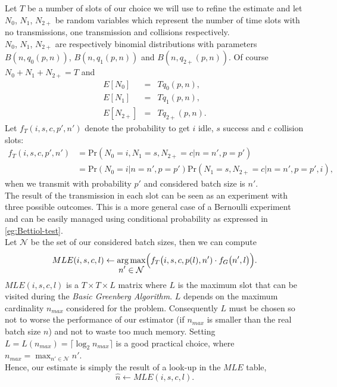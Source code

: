 \documentclass[11pt,a4paper,twoside,openright]{book}
\DeclareMathOperator*{\argmax}{arg\,max}
\DeclareMathOperator*{\mymax}{max}
\newcommand{\fg}{f_{G}}
\begin{document}
 Let $T$ be a number of slots of our choice we will use to refine the estimate and let $N_{0}$, $N_{1}$, $N_{2+}$ be random variables which represent the number of time slots with no transmissions, one transmission and collisions respectively.\\
 $N_{0}$, $N_{1}$, $N_{2+}$ are respectively binomial distributions with parameters $B(n,q_{0}(p,n))$, $B(n,q_{1}(p,n))$ and $B(n,q_{2+}(p,n))$. Of course $N_{0}+N_{1}+N_{2+}=T$ and
 \begin{eqnarray*}
E[N_{0}] &=& Tq_{0}(p,n),\\
E[N_{1}] &=& Tq_{1}(p,n),\\
E[N_{2+}] &=& Tq_{2+}(p,n).
\end{eqnarray*}
Let $f_{T}(i,s,c,p',n')$ denote the probability to get $i$ idle, $s$ success and $c$ collision slots:
\begin{align}
\label{eg:Bettiol-test}
f_{T}(i,s,c,p',n')&= \textrm{Pr}(N_{0}=i,N_{1}=s,N_{2+}=c|n=n',p=p')\\
\nonumber
 &=\textrm{Pr}(N_{0}=i|n=n',p=p')\textrm{Pr}(N_{1}=s,N_{2+}=c|n=n',p=p',i),
\end{align}
when we transmit with probability $p'$ and considered batch size is $n'$.\\
The result of the transmission in each slot can be seen as an experiment with three possible outcomes. This is a more general case of a Bernoulli experiment and can be easily managed using conditional probability as expressed in \eqref{eg:Bettiol-test}. \\
Let $\mathcal{N}$ be the set of our considered batch sizes, then we can compute
\begin{equation}
MLE(i,s,c,l) \gets \argmax_{\displaystyle{n' \in \mathcal{N}}} \Bigl( f_{T}\bigl(i,s,c,p(l),n')\cdot \fg\bigl(n',l\bigr)\Bigr).
\label{eq:MLEiscl}
\end{equation}
$MLE(i,s,c,l)$ is a $T \times T \times L$ matrix where $L$ is the maximum slot that can be visited during the  \emph{Basic Greenberg Algorithm}. $L$ depends on the maximum cardinality  $n_{max}$ considered for the problem. Consequently  $L$ must be chosen so not to worse the performance of our estimator (if $n_{max}$ is smaller than the real batch size $n$) and not to waste too much memory. Setting $L= L(n_{max}) = \lceil\log_{2}n_{max}\rceil$ is a good practical choice, where $\displaystyle n_{max}= \mymax_{n' \in \mathcal{N}}{n'}$.\\
Hence, our estimate is simply the result of a look-up in the $MLE$ table,
\begin{equation}
\hat{n} \longleftarrow MLE(i,s,c,l).
\end{equation}
\end{document}
